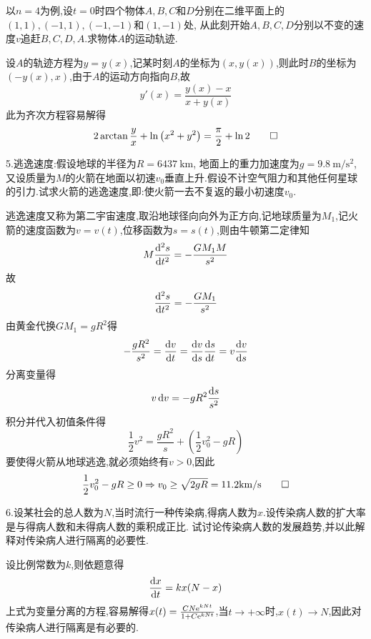 以$n=4$为例,设$t=0$时四个物体$A,B,C$和$D$分别在二维平面上的$(1,1),(-1,1),(-1,-1)$和$(1,-1)$处,
从此刻开始$A,B,C,D$分别以不变的速度$v$追赶$B,C,D,A$.求物体$A$的运动轨迹.
\begin{solve}
设$A$的轨迹方程为$y=y(x)$,记某时刻$A$的坐标为$(x,y(x))$,则此时$B$的坐标为$(-y(x),x)$,由于$A$的运动方向指向$B$,故
\[y'(x)=\frac{y(x)-x}{x+y(x)}\]
此为齐次方程容易解得
\[2\arctan\frac{y}{x}+\ln\left(x^2+y^2\right)=\frac{\pi}{2}+\ln2\qedhere\]
\end{solve}


5.{\heiti 逃逸速度}:假设地球的半径为$R=\qty{6437}{\kilo\metre}$,
地面上的重力加速度为$g=\qty{9.8}{\meter\per\square\second}$,
又设质量为$M$的火箭在地面以初速$v_0$垂直上升.假设不计空气阻力和其他任何星球的引力.试求火箭的逃逸速度,即:使火箭一去不复返的最小初速度$v_0$.

\begin{solve}
逃逸速度又称为第二宇宙速度,取沿地球径向向外为正方向,记地球质量为$M_1$,记火箭的速度函数为$v=v(t)$,位移函数为$s=s(t)$,则由牛顿第二定律知
\[M\frac{\mathop{}\!\mathrm{d}^2s}{\mathop{}\!\mathrm{d} t^2}=-\frac{GM_1M}{s^2}\]
故\[\frac{\mathop{}\!\mathrm{d}^2s}{\mathop{}\!\mathrm{d} t^2}=-\frac{GM_1}{s^2}\]
由黄金代换$GM_1=gR^2$得\[-\frac{gR^2}{s^2}=\frac{\diff v}{\diff t}=\frac{\diff v}{\diff s}\frac{\diff s}{\diff t}=v\frac{\diff v}{\diff s}\]
分离变量得
\[v\mathop{}\!\mathrm{d} v=-gR^2\frac{\mathop{}\!\mathrm{d} s}{s^2}\]
积分并代入初值条件得\[\frac{1}{2}v^2=\frac{gR^2}{s}+\left(\frac{1}{2}v_0^2-gR\right)\]
要使得火箭从地球逃逸,就必须始终有$v>0$,因此
\[\frac{1}{2}v_0^2-gR\geq0\Rightarrow v_0\geq\sqrt{2gR}=11.2\mathrm{km}/\mathrm{s}\qedhere\]
\end{solve}


6.设某社会的总人数为$N$,当时流行一种传染病,得病人数为$x$.设传染病人数的扩大率是与得病人数和未得病人数的乘积成正比.
试讨论传染病人数的发展趋势,并以此解释对传染病人进行隔离的必要性.
\begin{solve}
设比例常数为$k$,则依题意得\[\frac{\mathop{}\!\mathrm{d} x}{\mathop{}\!\mathrm{d} t}=kx(N-x)\]
上式为变量分离的方程,容易解得$x(t)=\frac{CN\mathrm{e}^{kNt}}{1+C\mathrm{e}^{kNt}}$,当$t\to+\infty$时,$x(t)\to N$,因此对传染病人进行隔离是有必要的.
\end{solve}